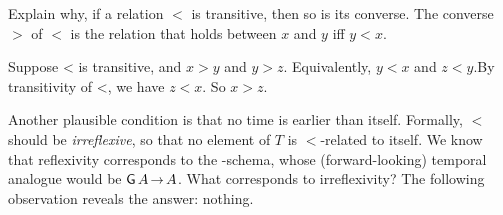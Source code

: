 \begin{exercise}
  Explain why, if a relation $<$ is transitive, then so is its converse. The
  converse $>$ of $<$ is the relation that holds between $x$ and $y$ iff $y<x$.
\end{exercise}
\begin{solution}
  Suppose < is transitive, and $x > y$ and $y > z$. Equivalently, $y < x$ and
  $z < y$.By transitivity of <, we have $z < x$. So $x > z$.
\end{solution}

Another plausible condition is that no time is earlier than itself. Formally,
$<$ should be \emph{irreflexive}, so that no element of $T$ is $<$-related to
itself. We know that reflexivity corresponds to the -schema, whose
(forward-looking) temporal analogue would be $\tG A \to A$. What corresponds to
irreflexivity? The following observation reveals the answer: nothing.

